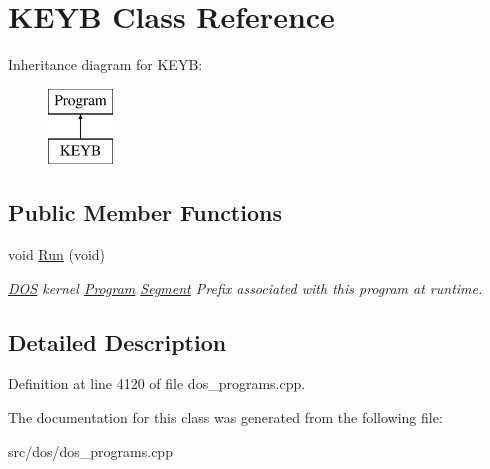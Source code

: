 \hypertarget{classKEYB}{\section{K\-E\-Y\-B Class Reference}
\label{classKEYB}
}
Inheritance diagram for K\-E\-Y\-B\-:\begin{figure}[H]
\begin{center}
\leavevmode
\includegraphics[height=2.000000cm]{classKEYB}
\end{center}
\end{figure}
\subsection*{Public Member Functions}
\begin{DoxyCompactItemize}
\item 
\hypertarget{classKEYB_a0ddb778460bbba0ce194908d8a405d24}{void \hyperlink{classKEYB_a0ddb778460bbba0ce194908d8a405d24}{Run} (void)}\label{classKEYB_a0ddb778460bbba0ce194908d8a405d24}

\begin{DoxyCompactList}\small\item\em \hyperlink{classDOS}{D\-O\-S} kernel \hyperlink{classProgram}{Program} \hyperlink{structSegment}{Segment} Prefix associated with this program at runtime. \end{DoxyCompactList}\end{DoxyCompactItemize}


\subsection{Detailed Description}


Definition at line 4120 of file dos\-\_\-programs.\-cpp.



The documentation for this class was generated from the following file\-:\begin{DoxyCompactItemize}
\item 
src/dos/dos\-\_\-programs.\-cpp\end{DoxyCompactItemize}

